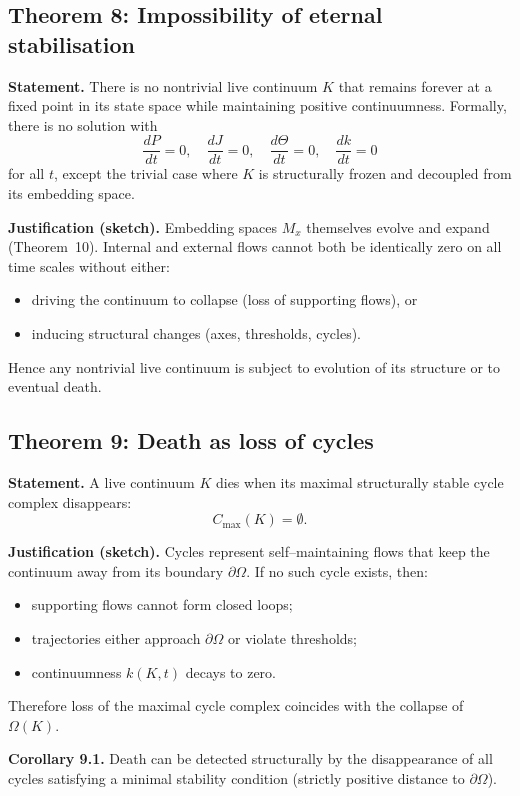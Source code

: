 \subsection{Theorem 8: Impossibility of eternal stabilisation}
\label{thm:no-eternal-stabilisation}

\textbf{Statement.}
There is no nontrivial live continuum \(K\) that remains forever at a fixed point in its state space while maintaining positive continuumness.
Formally, there is no solution with
\[
    \frac{dP}{dt} = 0, \quad \frac{dJ}{dt} = 0, \quad \frac{d\Theta}{dt} = 0, \quad \frac{dk}{dt} = 0
\]
for all \(t\), except the trivial case where \(K\) is structurally frozen and decoupled from its embedding space.

\textbf{Justification (sketch).}
Embedding spaces \(M_x\) themselves evolve and expand (Theorem~10).
Internal and external flows cannot both be identically zero on all time scales without either:
\begin{itemize}
    \item driving the continuum to collapse (loss of supporting flows), or
    \item inducing structural changes (axes, thresholds, cycles).
\end{itemize}
Hence any nontrivial live continuum is subject to evolution of its structure or to eventual death.

\subsection{Theorem 9: Death as loss of cycles}

\textbf{Statement.}
A live continuum \(K\) dies when its maximal structurally stable cycle complex disappears:
\[
    C_{\max}(K) = \emptyset.
\]

\textbf{Justification (sketch).}
Cycles represent self–maintaining flows that keep the continuum away from its boundary \(\partial\Omega\).
If no such cycle exists, then:
\begin{itemize}
    \item supporting flows cannot form closed loops;
    \item trajectories either approach \(\partial\Omega\) or violate thresholds;
    \item continuumness \(k(K,t)\) decays to zero.
\end{itemize}
Therefore loss of the maximal cycle complex coincides with the collapse of \(\Omega(K)\).

\textbf{Corollary 9.1.}
Death can be detected structurally by the disappearance of all cycles satisfying a minimal stability condition (strictly positive distance to \(\partial\Omega\)).

